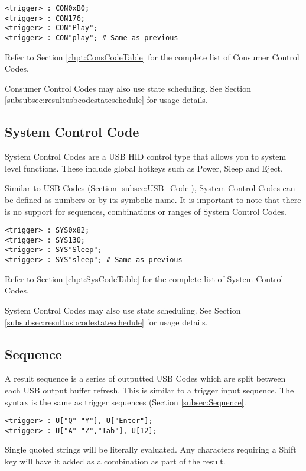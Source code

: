 \documentclass{kiibohd-template}
\begin{document}
\begin{lstlisting}
<trigger> : CON0xB0;
<trigger> : CON176;
<trigger> : CON"Play";
<trigger> : CON"play"; # Same as previous
\end{lstlisting}

Refer to Section \ref{chpt:ConsCodeTable} for the complete list of Consumer Control Codes.

Consumer Control Codes may also use state scheduling. See Section \ref{subsubsec:resultusbcodestateschedule} for usage details.


\subsection{System Control Code}

System Control Codes are a USB HID control type that allows you to system level functions.
These include global hotkeys such as Power, Sleep and Eject.

Similar to USB Codes (Section \ref{subsec:USB_Code}), System Control Codes can be defined as numbers or by its symbolic name.
It is important to note that there is no support for sequences, combinations or ranges of System Control Codes.

\begin{lstlisting}
<trigger> : SYS0x82;
<trigger> : SYS130;
<trigger> : SYS"Sleep";
<trigger> : SYS"sleep"; # Same as previous
\end{lstlisting}

Refer to Section \ref{chpt:SysCodeTable} for the complete list of System Control Codes.

System Control Codes may also use state scheduling. See Section \ref{subsubsec:resultusbcodestateschedule} for usage details.


\subsection{Sequence}

A result sequence is a series of outputted USB Codes which are split between each USB output buffer refresh.
This is similar to a trigger input sequence.
The syntax is the same as trigger sequences (Section \ref{subsec:Sequence}.

\begin{lstlisting}
<trigger> : U["Q"-"Y"], U["Enter"];
<trigger> : U["A"-"Z","Tab"], U[12];
\end{lstlisting}

Single quoted strings will be literally evaluated.
Any characters requiring a Shift key will have it added as a combination as part of the result.
\end{document}
